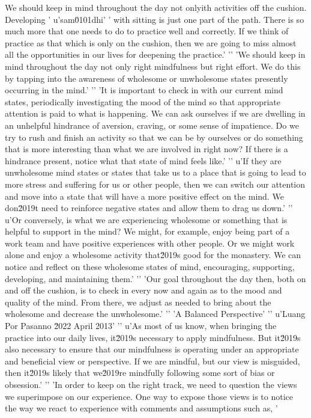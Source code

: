 We should keep in mind throughout the day not onlyith activities off the cushion. Developing '
u'sam\u0101dhi'
' with sitting is just one part of the path. There is so much more that one needs to do to practice well and correctly. If we think of practice as that which is only on the cushion, then we are going to miss almost all the opportunities in our lives for deepening the practice.'
'\n'
'We should keep in mind throughout the day not only right mindfulness but right effort. We do this by tapping into the awareness of wholesome or unwholesome states presently occurring in the mind.'
'\n'
'It is important to check in with our current mind states, periodically investigating the mood of the mind so that appropriate attention is paid to what is happening. We can ask ourselves if we are dwelling in an unhelpful hindrance of aversion, craving, or some sense of impatience. Do we try to rush and finish an activity so that we can be by ourselves or do something that is more interesting than what we are involved in right now? If there is a hindrance present, notice what that state of mind feels like.'
'\n'
u'If they are unwholesome mind states or states that take us to a place that is going to lead to more stress and suffering for us or other people, then we can switch our attention and move into a state that will have a more positive effect on the mind. We don\u2019t need to reinforce negative states and allow them to drag us down.'
'\n'
u'Or conversely, is what we are experiencing wholesome or something that is helpful to support in the mind? We might, for example, enjoy being part of a work team and have positive experiences with other people. Or we might work alone and enjoy a wholesome activity that\u2019s good for the monastery. We can notice and reflect on these wholesome states of mind, encouraging, supporting, developing, and maintaining them.'
'\n'
'Our goal throughout the day then, both on and off the cushion, is to check in every now and again as to the mood and quality of the mind. From there, we adjust as needed to bring about the wholesome and decrease the unwholesome.'
'\n'
'A Balanced Perspective'
'\n'
u'Luang Por Pasanno \u2022 April 2013'
'\n'
u'As most of us know, when bringing the practice into our daily lives, it\u2019s necessary to apply mindfulness. But it\u2019s also necessary to ensure that our mindfulness is operating under an appropriate and beneficial view or perspective. If we are mindful, but our view is misguided, then it\u2019s likely that we\u2019re mindfully following some sort of bias or obsession.'
'\n'
'In order to keep on the right track, we need to question the views we superimpose on our experience. One way to expose those views is to notice the way we react to experience with comments and assumptions such as, '
